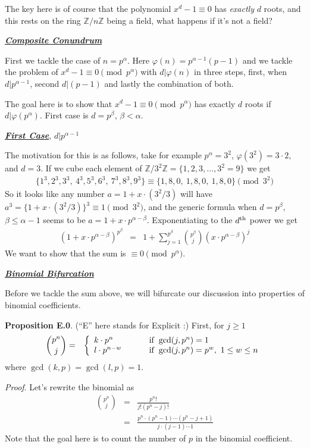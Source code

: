 \documentclass[aps,preprint,preprintnumbers,nofootinbib,showpacs,prd]{revtex4-1}
\newcommand{\nbea}{\begin{eqnarray*}}
\newcommand{\neea}{\end{eqnarray*}}
\begin{document}
The key here is of course that the polynomial $x^d - 1 \equiv 0$ has {\it exactly} $d$ roots, and this rests on the ring $\mathbb{Z}/n\mathbb{Z}$ being a field, what happens if it's not a field?

\bigskip
\underline{\textit{\textbf{Composite Conundrum}}}
\bigskip

First we tackle the case of $n = p^\alpha$. Here $\varphi(n) = p^{\alpha-1}(p-1)$ and we tackle the problem of $x^d - 1\equiv 0 \pmod{p^\alpha}$ with $d|\varphi(n)$ in three steps, first, when $d|p^{\alpha-1}$, second $d|(p-1)$ and lastly the combination of both.

The goal here is to show that $x^d - 1 \equiv 0 \pmod{p^\alpha}$ has exactly $d$ roots if $d|\varphi(p^\alpha)$. First case is $d = p^\beta$, $\beta < \alpha$.

\bigskip
\underline{\textit{\textbf{First Case}}}, $d|p^{\alpha-1}$
\smallskip

The motivation for this is as follows, take for example $p^\alpha=3^2$, $\varphi(3^2) = 3\cdot 2$, and $d = 3$. If we cube each element of $\mathbb{Z}/3^2\mathbb{Z} = \{1,2,3,\dots,3^2 = 9\}$ we get
%
\nbea
\{1^3, 2^3, 3^3,~4^3, 5^3, 6^3,~7^3, 8^3, 9^3\} \equiv \{1, 8, 0,~1, 8, 0,~1, 8, 0\} \pmod{3^2}
\neea
%
So it looks like any number $a = 1 + x\cdot (3^2/3)$ will have $a^3 = \{1+x\cdot (3^2/3)\}^3 \equiv 1 \pmod{3^2}$, and the generic formula when $d = p^\beta$, $\beta \le \alpha - 1$ seems to be $a = 1 + x\cdot p^{\alpha-\beta}$. Exponentiating to the $d^{\rm th}$ power we get
%
\nbea
(1 + x\cdot p^{\alpha-\beta})^{p^\beta} & = & 1 + \sum_{j=1}^{p^\beta}\binom{p^\beta}{j} (x\cdot p^{\alpha-\beta})^j
\neea
%
We want to show that the sum is $\equiv 0 \pmod{p^\alpha}$. 

\smallskip
\underline{\textit{\textbf{Binomial Bifurcation}}}
\smallskip

Before we tackle the sum above, we will bifurcate our discussion into properties of binomial coefficients.

{\bf Proposition E.0}. (``E'' here stands for Explicit :) First, for $j \ge 1$ 
%
\nbea
\binom{p^n}{j} & = & \left\{
\begin{array}{l l}
k \cdot p^n & ~~~~~~~ {\rm if ~} \gcd(j,p^n) = 1 \\
l \cdot p^{n-w} & ~~~~~~~ {\rm if ~} \gcd(j,p^n) = p^w, ~ 1 \le w \le n
\end{array} \right.
\neea
%
where $\gcd(k,p) = \gcd(l,p) = 1$.

{\it Proof}. Let's rewrite the binomial as
%
\nbea
\binom{p^n}{j} & = & \frac{p^n!}{j!(p^n - j)!} \\
& = & \frac{p^n\cdot(p^n-1)\cdots (p^n - j + 1)}{j\cdot(j-1)\cdots 1}
\neea
%
Note that the goal here is to count the number of $p$ in the binomial coefficient.
\end{document}
